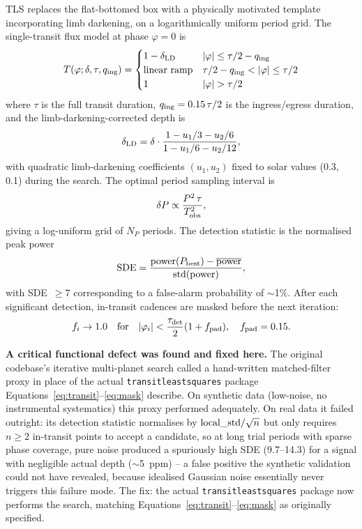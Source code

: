 \documentclass[11pt]{article}
\begin{document}
TLS \citep{Hippke2019} replaces the flat-bottomed box with a physically motivated template incorporating limb darkening, on a logarithmically uniform period grid. The single-transit flux model at phase $\varphi=0$ is
\begin{equation}
T(\varphi;\delta,\tau,q_{\rm ing}) =
\begin{cases}
1-\delta_{\rm LD} & |\varphi|\le \tau/2 - q_{\rm ing} \\
\text{linear ramp} & \tau/2-q_{\rm ing} < |\varphi| \le \tau/2 \\
1 & |\varphi| > \tau/2
\end{cases}
\label{eq:transit}
\end{equation}
where $\tau$ is the full transit duration, $q_{\rm ing}=0.15\,\tau/2$ is the ingress/egress duration, and the limb-darkening-corrected depth is
\begin{equation}
\delta_{\rm LD} = \delta \cdot \frac{1-u_1/3-u_2/6}{1-u_1/6-u_2/12},
\label{eq:limbdark}
\end{equation}
with quadratic limb-darkening coefficients $(u_1,u_2)$ fixed to solar values (0.3, 0.1) during the search. The optimal period sampling interval \citep{Ofir2014} is
\begin{equation}
\delta P \propto \frac{P^2\,\tau}{T_{\rm obs}^2},
\label{eq:periodgrid}
\end{equation}
giving a log-uniform grid of $N_P$ periods. The detection statistic is the normalised peak power
\begin{equation}
{\rm SDE} = \frac{{\rm power}(P_{\rm best}) - \overline{\rm power}}{{\rm std}({\rm power})},
\label{eq:sde}
\end{equation}
with SDE~$\ge 7$ corresponding to a false-alarm probability of $\sim$1\%. After each significant detection, in-transit cadences are masked before the next iteration:
\begin{equation}
f_i \to 1.0 \quad \text{for} \quad |\varphi_i| < \frac{\tau_{\rm det}}{2}(1+f_{\rm pad}), \quad f_{\rm pad}=0.15.
\label{eq:mask}
\end{equation}

\textbf{A critical functional defect was found and fixed here.} The original codebase's iterative multi-planet search called a hand-written matched-filter proxy in place of the actual \texttt{transitleastsquares} package Equations~\ref{eq:transit}--\ref{eq:mask} describe. On synthetic data (low-noise, no instrumental systematics) this proxy performed adequately. On real data it failed outright: its detection statistic normalises by ${\rm local\_std}/\sqrt{n}$ but only requires $n\ge 2$ in-transit points to accept a candidate, so at long trial periods with sparse phase coverage, pure noise produced a spuriously high SDE (9.7--14.3) for a signal with negligible actual depth ($\sim$5~ppm) -- a false positive the synthetic validation could not have revealed, because idealised Gaussian noise essentially never triggers this failure mode. The fix: the actual \texttt{transitleastsquares} package now performs the search, matching Equations~\ref{eq:transit}--\ref{eq:mask} as originally specified.
\end{document}

